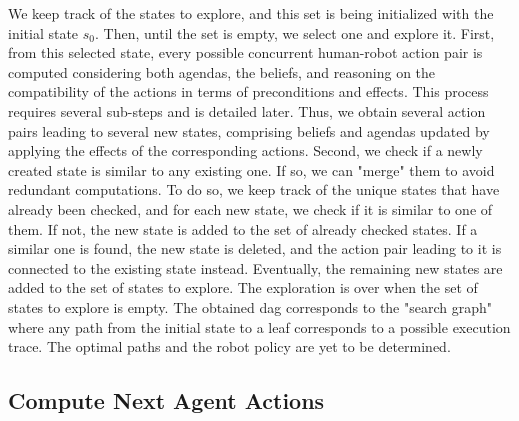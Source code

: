 We keep track of the states to explore, and this set is being initialized with the initial state $s_0$. Then, until the set is empty, we select one and explore it.
First, from this selected state, every possible concurrent human-robot action pair is computed considering both agendas, the beliefs, and reasoning on the compatibility of the actions in terms of preconditions and effects. This process requires several sub-steps and is detailed later. Thus, we obtain several action pairs leading to several new states, comprising beliefs and agendas updated by applying the effects of the corresponding actions.
Second, we check if a newly created state is similar to any existing one. If so, we can "merge" them to avoid redundant computations. To do so, we keep track of the unique states that have already been checked, and for each new state, we check if it is similar to one of them. 
If not, the new state is added to the set of already checked states. 
If a similar one is found, the new state is deleted, and the action pair leading to it is connected to the existing state instead.
Eventually, the remaining new states are added to the set of states to explore. 
The exploration is over when the set of states to explore is empty. The obtained \acrshort{dag} corresponds to the "search graph" where any path from the initial state to a leaf corresponds to a possible execution trace. The optimal paths and the robot policy are yet to be determined.

    \subsection*{Compute Next Agent Actions}

